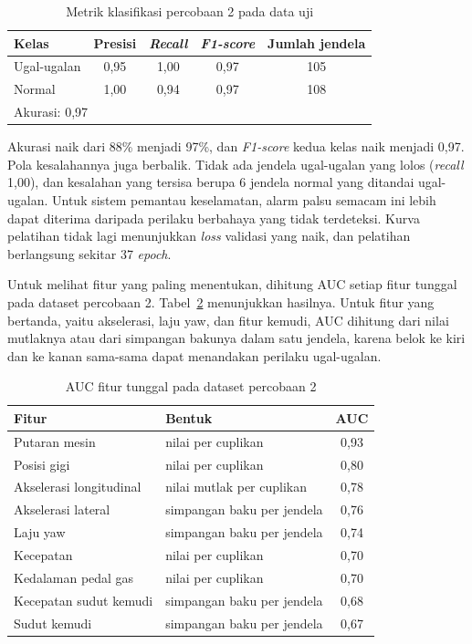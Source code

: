 \begin{table}[H]
  \centering
  \caption{Metrik klasifikasi percobaan 2 pada data uji}
  \label{tab:metrik-2}
  \begin{tabular}{|l|c|c|c|c|}
    \hline
    \textbf{Kelas} & \textbf{Presisi} & \textbf{\textit{Recall}} & \textbf{\textit{F1-score}} & \textbf{Jumlah jendela} \\
    \hline
    Ugal-ugalan & 0,95 & 1,00 & 0,97 & 105 \\
    \hline
    Normal & 1,00 & 0,94 & 0,97 & 108 \\
    \hline
    \multicolumn{5}{|l|}{Akurasi: 0,97} \\
    \hline
  \end{tabular}
\end{table}

Akurasi naik dari 88\% menjadi 97\%, dan \textit{F1-score} kedua kelas naik menjadi 0,97. Pola kesalahannya juga berbalik. Tidak ada jendela ugal-ugalan yang lolos (\textit{recall} 1,00), dan kesalahan yang tersisa berupa 6 jendela normal yang ditandai ugal-ugalan. Untuk sistem pemantau keselamatan, alarm palsu semacam ini lebih dapat diterima daripada perilaku berbahaya yang tidak terdeteksi. Kurva pelatihan tidak lagi menunjukkan \textit{loss} validasi yang naik, dan pelatihan berlangsung sekitar 37 \textit{epoch}.

Untuk melihat fitur yang paling menentukan, dihitung AUC setiap fitur tunggal pada dataset percobaan 2. Tabel~\ref{tab:auc-fitur} menunjukkan hasilnya. Untuk fitur yang bertanda, yaitu akselerasi, laju yaw, dan fitur kemudi, AUC dihitung dari nilai mutlaknya atau dari simpangan bakunya dalam satu jendela, karena belok ke kiri dan ke kanan sama-sama dapat menandakan perilaku ugal-ugalan.

\begin{table}[H]
  \centering
  \caption{AUC fitur tunggal pada dataset percobaan 2}
  \label{tab:auc-fitur}
  \small
  \begin{tabular}{|l|l|c|}
    \hline
    \textbf{Fitur} & \textbf{Bentuk} & \textbf{AUC} \\
    \hline
    Putaran mesin & nilai per cuplikan & 0,93 \\
    \hline
    Posisi gigi & nilai per cuplikan & 0,80 \\
    \hline
    Akselerasi longitudinal & nilai mutlak per cuplikan & 0,78 \\
    \hline
    Akselerasi lateral & simpangan baku per jendela & 0,76 \\
    \hline
    Laju yaw & simpangan baku per jendela & 0,74 \\
    \hline
    Kecepatan & nilai per cuplikan & 0,70 \\
    \hline
    Kedalaman pedal gas & nilai per cuplikan & 0,70 \\
    \hline
    Kecepatan sudut kemudi & simpangan baku per jendela & 0,68 \\
    \hline
    Sudut kemudi & simpangan baku per jendela & 0,67 \\
    \hline
  \end{tabular}
\end{table}

